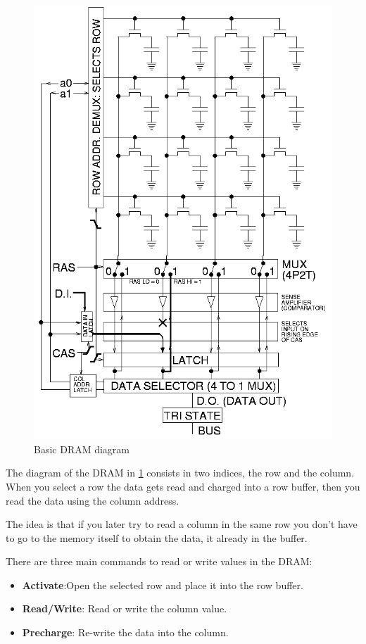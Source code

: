 \begin{figure}
    \centering
    \includegraphics[scale=0.3]{img/dram.png}
    \caption{Basic DRAM diagram}
    \label{fig:dram_diag}
\end{figure}

The diagram of the DRAM in \ref{fig:dram_diag} consists in two indices, the row and the column. When you select a row the data gets read and charged into a row buffer, then you read the data using the column address.

The idea is that if you later try to read a column in the same row you don't have to go to the memory itself to obtain the data, it already in the buffer. 

There are three main commands to read or write values in the DRAM:

\begin{itemize}
    \item \textbf{Activate}:Open the selected row and place it into the row buffer.
    \item \textbf{Read/Write}: Read or write the column value.
    \item \textbf{Precharge}: Re-write the data into the column.
\end{itemize}

